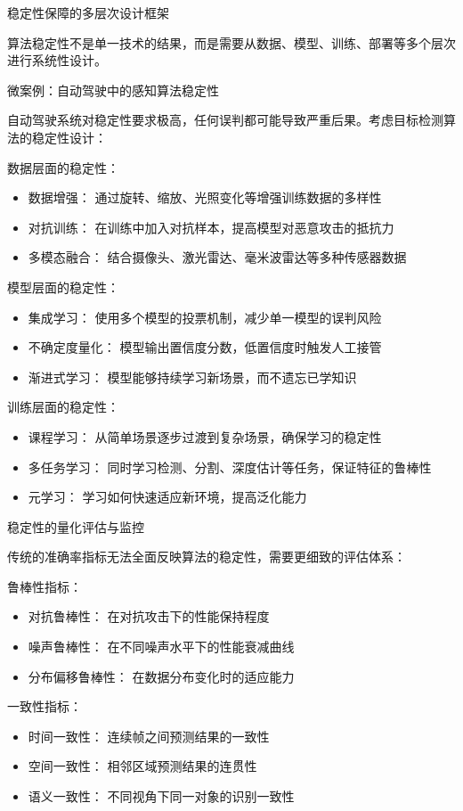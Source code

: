 稳定性保障的多层次设计框架

算法稳定性不是单一技术的结果，而是需要从数据、模型、训练、部署等多个层次进行系统性设计。

微案例：自动驾驶中的感知算法稳定性

自动驾驶系统对稳定性要求极高，任何误判都可能导致严重后果。考虑目标检测算法的稳定性设计：

数据层面的稳定性：
\begin{itemize}
\item 数据增强： 通过旋转、缩放、光照变化等增强训练数据的多样性
\item 对抗训练： 在训练中加入对抗样本，提高模型对恶意攻击的抵抗力
\item 多模态融合： 结合摄像头、激光雷达、毫米波雷达等多种传感器数据
\end{itemize}

模型层面的稳定性：
\begin{itemize}
\item 集成学习： 使用多个模型的投票机制，减少单一模型的误判风险
\item 不确定度量化： 模型输出置信度分数，低置信度时触发人工接管
\item 渐进式学习： 模型能够持续学习新场景，而不遗忘已学知识
\end{itemize}

训练层面的稳定性：
\begin{itemize}
\item 课程学习： 从简单场景逐步过渡到复杂场景，确保学习的稳定性
\item 多任务学习： 同时学习检测、分割、深度估计等任务，保证特征的鲁棒性
\item 元学习： 学习如何快速适应新环境，提高泛化能力
\end{itemize}

稳定性的量化评估与监控

传统的准确率指标无法全面反映算法的稳定性，需要更细致的评估体系：

鲁棒性指标：
\begin{itemize}
\item 对抗鲁棒性： 在对抗攻击下的性能保持程度
\item 噪声鲁棒性： 在不同噪声水平下的性能衰减曲线
\item 分布偏移鲁棒性： 在数据分布变化时的适应能力
\end{itemize}

一致性指标：
\begin{itemize}
\item 时间一致性： 连续帧之间预测结果的一致性
\item 空间一致性： 相邻区域预测结果的连贯性
\item 语义一致性： 不同视角下同一对象的识别一致性
\end{itemize}


